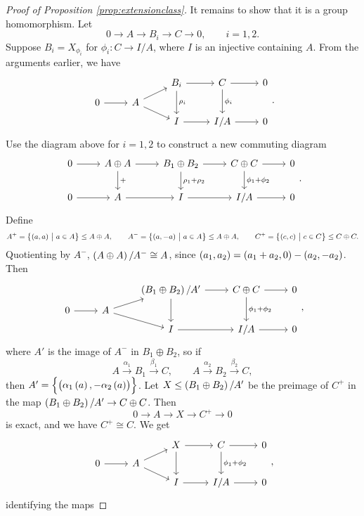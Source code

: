\begin{proof}[Proof of Proposition \ref{prop:extensionclass}]
It remains to show that it is a group homomorphism. Let
$$ 0 \to A \to B_i \to C \to 0, \qquad i = 1, 2. $$
Suppose $ B_i = X_{\phi_i} $ for $ \phi_i : C \to I / A $, where $ I $ is an injective containing $ A $. From the arguments earlier, we have
$$
\begin{tikzcd}[row sep=tiny]
& & B_i \arrow{r} \arrow{dd}{\rho_i} & C \arrow{r} \arrow{dd}{\phi_i} & 0 \\
0 \arrow{r} & A \arrow{ur} \arrow{dr} & & \\
& & I \arrow{r} & I / A \arrow{r} & 0
\end{tikzcd}.
$$
Use the diagram above for $ i = 1, 2 $ to construct a new commuting diagram
$$
\begin{tikzcd}
0 \arrow{r} & A \oplus A \arrow{r} \arrow{d}{+} & B_1 \oplus B_2 \arrow{r} \arrow{d}{\rho_1 + \rho_2} & C \oplus C \arrow{r} \arrow{d}{\phi_1 + \phi_2} & 0 \\
0 \arrow{r} & A \arrow{r} & I \arrow{r} & I / A \arrow{r} & 0
\end{tikzcd}.
$$
Define
$$ A^+ = \cbr{\br{a, a} \st a \in A} \le A \oplus A, \qquad A^- = \cbr{\br{a, -a} \st a \in A} \le A \oplus A, \qquad C^+ = \cbr{\br{c, c} \st c \in C} \le C \oplus C. $$
Quotienting by $ A^- $, $ \br{A \oplus A} / A^- \cong A $, since $ \br{a_1, a_2} = \br{a_1 + a_2, 0} - \br{a_2, -a_2} $. Then
$$
\begin{tikzcd}[row sep=tiny]
& & \br{B_1 \oplus B_2} / A' \arrow{r} \arrow{dd} & C \oplus C \arrow{r} \arrow{dd}{\phi_1 + \phi_2} & 0 \\
0 \arrow{r} & A \arrow{ur} \arrow{dr} & & \\
& & I \arrow{r} & I / A \arrow{r} & 0
\end{tikzcd},
$$
where $ A' $ is the image of $ A^- $ in $ B_1 \oplus B_2 $, so if
$$ A \xrightarrow{\alpha_1} B_1 \xrightarrow{\beta_1} C, \qquad A \xrightarrow{\alpha_2} B_2 \xrightarrow{\beta_2} C, $$
then $ A' = \cbr{\br{\alpha_1\br{a}, -\alpha_2\br{a}}} $. Let $ X \le \br{B_1 \oplus B_2} / A' $ be the preimage of $ C^+ $ in the map $ \br{B_1 \oplus B_2} / A' \to C \oplus C $. Then
$$ 0 \to A \to X \to C^+ \to 0 $$
is exact, and we have $ C^+ \cong C $. We get
$$
\begin{tikzcd}[row sep=tiny]
& & X \arrow{r} \arrow{dd} & C \arrow{r} \arrow{dd}{\phi_1 + \phi_2} & 0 \\
0 \arrow{r} & A \arrow{ur} \arrow{dr} & & \\
& & I \arrow{r} & I / A \arrow{r} & 0
\end{tikzcd},
$$
identifying the maps

\end{proof}
